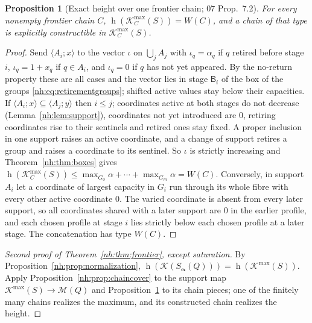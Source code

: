 \documentclass[11pt,a4paper]{article}
\newtheorem{proposition}[theorem]{Proposition}
\theoremstyle{definition}
\theoremstyle{remark}
\newcommand{\K}{\mathcal K}
\newcommand{\M}{\mathcal M}
\newcommand{\hgt}{\operatorname{h}}
\newcommand{\Kmax}{\K^{\max}}
\begin{document}
\begin{proposition}[Exact height over one frontier chain; 07 Prop.~7.2]
\label{nh:prop:pathheight}
For every nonempty frontier chain $C$, $\hgt(\Kmax_C(S))=W(C)$, and a chain of
that type is explicitly constructible in $\Kmax_C(S)$.
\end{proposition}
\begin{proof}
Send $\langle A_i;x\rangle$ to the vector $\iota$ on $\bigcup_jA_j$ with
$\iota_q=\alpha_q$ if $q$ retired before stage $i$, $\iota_q=1+x_q$ if
$q\in A_i$, and $\iota_q=0$ if $q$ has not yet appeared. By the no-return
property these are all cases and the vector lies in stage $\mathsf B_i$ of the
box of the groups \eqref{nh:eq:retirementgroups}; shifted active values stay
below their capacities. If $\langle A_i;x\rangle\subseteq\langle A_j;y\rangle$
then $i\le j$; coordinates active at both stages do not decrease
(Lemma~\ref{nh:lem:support}), coordinates not yet introduced are $0$, retiring
coordinates rise to their sentinels and retired ones stay fixed. A proper
inclusion in one support raises an active coordinate, and a change of support
retires a group and raises a coordinate to its sentinel. So $\iota$ is strictly
increasing and Theorem~\ref{nh:thm:boxes} gives
$\hgt(\Kmax_C(S))\le\max_{G_0}\alpha+\cdots+\max_{G_m}\alpha=W(C)$. Conversely,
in support $A_i$ let a coordinate of largest capacity in $G_i$ run through its
whole fibre with every other active coordinate $0$. The varied coordinate is
absent from every later support, so all coordinates shared with a later support
are $0$ in the earlier profile, and each chosen profile at stage $i$ lies
strictly below each chosen profile at a later stage. The concatenation has type
$W(C)$.
\end{proof}

\begin{proof}[Second proof of Theorem~\ref{nh:thm:frontier}, except saturation]
By Proposition~\ref{nh:prop:normalization},
$\hgt(\K(S_{\boldsymbol\alpha}(Q)))=\hgt(\Kmax(S))$. Apply
Proposition~\ref{nh:prop:chaincover} to the support map $\Kmax(S)\to\M(Q)$ and
Proposition~\ref{nh:prop:pathheight} to its chain pieces; one of the finitely
many chains realizes the maximum, and its constructed chain realizes the height.
\end{proof}
\end{document}
